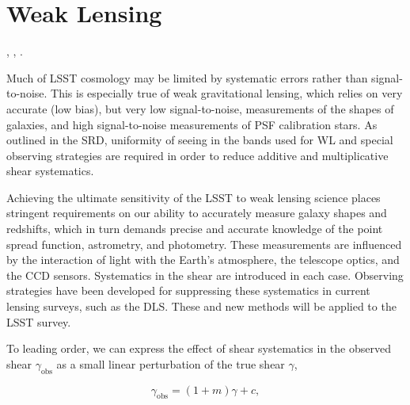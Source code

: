 %
%

\section{Weak Lensing}
\def\secname{wl}\label{sec:\secname}

,
,
.

Much of LSST cosmology may be limited by systematic errors rather than
signal-to-noise. This is especially true of weak gravitational lensing,  which
relies on very accurate (\ie low bias), but very low signal-to-noise,
measurements of the shapes of galaxies, and high signal-to-noise measurements of
PSF calibration stars. As outlined in the SRD, uniformity of seeing in the bands
used for WL and special observing strategies are required in order to reduce
additive and multiplicative shear systematics.

Achieving the ultimate sensitivity of the LSST to weak lensing science places
stringent requirements on our ability to accurately measure galaxy shapes and
redshifts, which in turn demands precise and accurate knowledge of the point
spread function, astrometry, and photometry. These measurements are influenced
by the interaction of light with the Earth's atmosphere, the telescope optics,
and the CCD sensors. Systematics in the shear are introduced in each case.
Observing strategies have been developed for suppressing these systematics in
current lensing surveys, such as the DLS.  These and new methods will be applied
to the LSST survey.

To leading order, we can express the effect of shear systematics in the observed
shear $\gamma_\mathrm{obs}$ as a small linear perturbation of the true shear
$\gamma$,

$$ \gamma_\mathrm{obs} = (1+m) \gamma + c, $$

